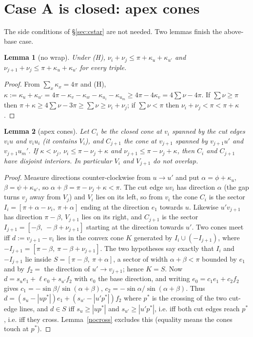 \documentclass[11pt]{article}
\newtheorem{lemma}{Lemma}
\theoremstyle{definition}
\theoremstyle{remark}
\begin{document}
\section{Case A is closed: apex cones}\label{sec:cones}

The side conditions of \S\ref{sec:cstar} are not needed. Two lemmas finish the above-base case.

\begin{lemma}[no wrap]\label{nowrap}
Under (H), $\nu_i+\nu_j\le \pi+\kappa_u+\kappa_{u'}$ and $\nu_{j+1}+\nu_j\le\pi+\kappa_u+\kappa_{u'}$ for every triple.
\end{lemma}
\begin{proof}
From $\sum_x\kappa_x=4\pi$ and (H), $\kappa:=\kappa_u+\kappa_{u'}=4\pi-\kappa_v-\kappa_w-\kappa_{u_i}-\kappa_{u_m}\ge 4\pi-4\kappa_v
=4\sum\nu-4\pi$. If $\sum\nu\ge\pi$ then $\pi+\kappa\ge 4\sum\nu-3\pi\ge\sum\nu\ge\nu_i+\nu_j$; if $\sum\nu<\pi$ then
$\nu_i+\nu_j<\pi<\pi+\kappa$.
\end{proof}

\begin{lemma}[apex cones]\label{cones}
Let $C_i$ be the closed cone at $v_i$ spanned by the cut edges $v_iu$ and $v_iu_i$ (it contains $V_i$), and $C_{j+1}$ the
cone at $v_{j+1}$ spanned by $v_{j+1}u'$ and $v_{j+1}u_m'$. If $\kappa<\nu_j$, $\nu_i\le\pi-\nu_j+\kappa$ and
$\nu_{j+1}\le\pi-\nu_j+\kappa$, then $C_i$ and $C_{j+1}$ have disjoint interiors. In particular $V_i$ and $V_{j+1}$ do not
overlap.
\end{lemma}
\begin{proof}
Measure directions counter-clockwise from $u\to u'$ and put $\alpha=\phi+\kappa_u$, $\beta=\psi+\kappa_{u'}$, so
$\alpha+\beta=\pi-\nu_j+\kappa<\pi$. The cut edge $uv_i$ has direction $\alpha$ (the gap turns $v_j$ away from $V_j$) and
$V_i$ lies on its left, so from $v_i$ the cone $C_i$ is the sector $I_i=[\pi+\alpha-\nu_i,\ \pi+\alpha]$ ending at the
direction $e_1$ towards $u$. Likewise $u'v_{j+1}$ has direction $\pi-\beta$, $V_{j+1}$ lies on its right, and
$C_{j+1}$ is the sector $I_{j+1}=[-\beta,\ -\beta+\nu_{j+1}]$ starting at the direction towards $u'$.
Two cones meet iff $d:=v_{j+1}-v_i$ lies in the convex cone $K$ generated by $I_i\cup(-I_{j+1})$, where
$-I_{j+1}=[\pi-\beta,\ \pi-\beta+\nu_{j+1}]$. The two hypotheses say exactly that $I_i$ and $-I_{j+1}$ lie inside
$S=[\pi-\beta,\ \pi+\alpha]$, a sector of width $\alpha+\beta<\pi$ bounded by $e_1$ and by $f_2=$ the direction of
$u'\to v_{j+1}$; hence $K=S$. Now $d=s_ue_1+\ell e_0+s_{u'}f_2$ with $e_0$ the base direction, and writing
$e_0=c_1e_1+c_2f_2$ gives $c_1=-\sin\beta/\sin(\alpha+\beta)$, $c_2=-\sin\alpha/\sin(\alpha+\beta)$. Thus
$d=(s_u-|up^*|)e_1+(s_{u'}-|u'p^*|)f_2$ where $p^*$ is the crossing of the two cut-edge lines, and $d\in S$ iff
$s_u\ge|up^*|$ and $s_{u'}\ge|u'p^*|$, i.e. iff both cut edges reach $p^*$, i.e. iff they cross. Lemma~\ref{nocross}
excludes this (equality means the cones touch at $p^*$).
\end{proof}
\end{document}
